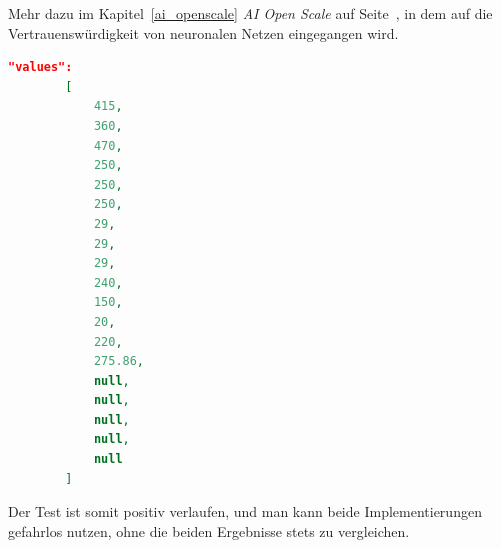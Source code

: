 Mehr dazu im Kapitel~\ref{ai_openscale} \textit{AI Open Scale} auf Seite~\pageref{ai_openscale}, in dem auf die
Vertrauenswürdigkeit von neuronalen Netzen eingegangen wird.

\begin{lstlisting}[language=JSON, caption=Parameter zum Test der beiden Implementierungen, label=ls:umsetzung_parameter]
    "values":
        [
            415,
            360,
            470,
            250,
            250,
            250,
            29,
            29,
            29,
            240,
            150,
            20,
            220,
            275.86,
            null,
            null,
            null,
            null,
            null
        ]
\end{lstlisting}

Der Test ist somit positiv verlaufen, und man kann beide Implementierungen gefahrlos nutzen, ohne die beiden Ergebnisse
stets zu vergleichen.
